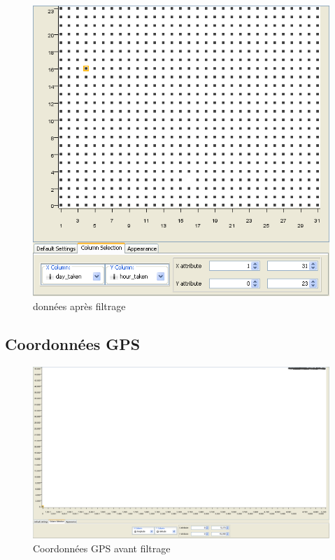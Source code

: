         \begin{figure}[h]
            \centering
            \includegraphics[scale=0.35]{../screenshots/day_hour_after.png}
            \caption{données apr\`es filtrage}
            \label{diagram:day_hour_after}
        \end{figure}

    \pagebreak
    \subsection{Coordonnées GPS}
        \begin{figure}[h]
            \centering
            \includegraphics[scale=0.22]{../screenshots/geographic_before.png}
            \caption{Coordonnées GPS avant filtrage}
            \label{diagram:geographic_before}
        \end{figure}

